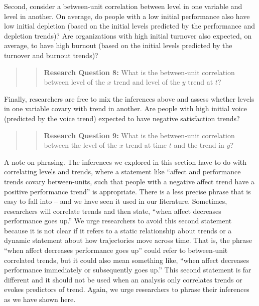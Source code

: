 \documentclass[english,,man]{apa6}
\theoremstyle{definition}
\theoremstyle{definition}
\theoremstyle{definition}
\theoremstyle{remark}
\begin{document}
Second, consider a between-unit correlation between level in one
variable and level in another. On average, do people with a low initial
performance also have low initial depletion (based on the initial levels
predicted by the performance and depletion trends)? Are organizations
with high initial turnover also expected, on average, to have high
burnout (based on the initial levels predicted by the turnover and
burnout trends)?

\begin{quote}
\begin{quote}
\textbf{Research Question 8:} What is the between-unit correlation
between level of the \(x\) trend and level of the \(y\) trend at \(t\)?
\end{quote}
\end{quote}

Finally, researchers are free to mix the inferences above and assess
whether levels in one variable covary with trend in another. Are people
with high initial voice (predicted by the voice trend) expected to have
negative satisfaction trends?

\begin{quote}
\begin{quote}
\textbf{Research Question 9:} What is the between-unit correlation
between the level of the \(x\) trend at time \(t\) and the trend in
\(y\)?
\end{quote}
\end{quote}

A note on phrasing. The inferences we explored in this section have to
do with correlating levels and trends, where a statement like
\enquote{affect and performance trends covary between-units, such that
people with a negative affect trend have a positive performance trend}
is appropriate. There is a less precise phrase that is easy to fall into
-- and we have seen it used in our literature. Sometimes, researchers
will correlate trends and then state, \enquote{when affect decreases
performance goes up.} We urge researchers to avoid this second statement
because it is not clear if it refers to a static relationship about
trends or a dynamic statement about how trajectories move across time.
That is, the phrase \enquote{when affect decreases performance goes up}
could refer to between-unit correlated trends, but it could also mean
something like, \enquote{when affect decreases performance immediately
or subsequently goes up.} This second statement is far different and it
should not be used when an analysis only correlates trends or evokes
predictors of trend. Again, we urge researchers to phrase their
inferences as we have shown here.
\end{document}
